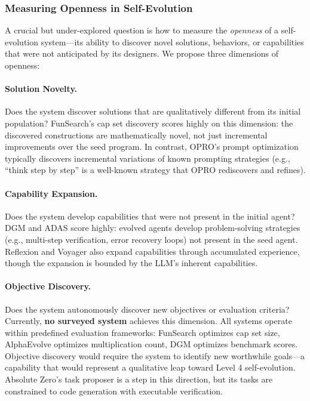 \subsubsection{Measuring Openness in Self-Evolution}

A crucial but under-explored question is how to measure the \emph{openness} of a self-evolution system---its ability to discover novel solutions, behaviors, or capabilities that were not anticipated by its designers. We propose three dimensions of openness:

\paragraph{Solution Novelty.}
Does the system discover solutions that are qualitatively different from its initial population? FunSearch's cap set discovery scores highly on this dimension: the discovered constructions are mathematically novel, not just incremental improvements over the seed program. In contrast, OPRO's prompt optimization typically discovers incremental variations of known prompting strategies (e.g., ``think step by step'' is a well-known strategy that OPRO rediscovers and refines).

\paragraph{Capability Expansion.}
Does the system develop capabilities that were not present in the initial agent? DGM and ADAS score highly: evolved agents develop problem-solving strategies (e.g., multi-step verification, error recovery loops) not present in the seed agent. Reflexion and Voyager also expand capabilities through accumulated experience, though the expansion is bounded by the LLM's inherent capabilities.

\paragraph{Objective Discovery.}
Does the system autonomously discover new objectives or evaluation criteria? Currently, \textbf{no surveyed system} achieves this dimension. All systems operate within predefined evaluation frameworks: FunSearch optimizes cap set size, AlphaEvolve optimizes multiplication count, DGM optimizes benchmark scores. Objective discovery would require the system to identify new worthwhile goals---a capability that would represent a qualitative leap toward Level 4 self-evolution. Absolute Zero's task proposer is a step in this direction, but its tasks are constrained to code generation with executable verification.

